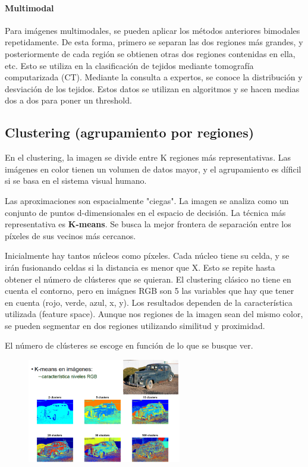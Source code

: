 \paragraph{Multimodal} 
Para imágenes multimodales, se pueden aplicar los métodos anteriores bimodales repetidamente. De esta forma, primero se separan las dos regiones más grandes, y posteriormente de cada región se obtienen otras dos regiones contenidas en ella, etc. Esto se utiliza en la clasificación de tejidos mediante tomografía computarizada (CT). Mediante la consulta a expertos, se conoce la distribución y desviación de los tejidos. Estos datos se utilizan en algoritmos y se hacen medias dos a dos para poner un threshold.

\subsection{Clustering (agrupamiento por regiones)}
En el clustering, la imagen se divide entre K regiones más representativas. Las imágenes en color tienen un volumen de datos mayor, y el agrupamiento es díficil si se basa en el sistema visual humano.

Las aproximaciones son espacialmente "ciegas". La imagen se analiza como un conjunto de puntos d-dimensionales en el espacio de decisión. La técnica más representativa es \textbf{K-means}. Se busca la mejor frontera de separación entre los píxeles de sus vecinos más cercanos. 

Inicialmente hay tantos núcleos como píxeles. Cada núcleo tiene su celda, y se irán fusionando celdas si la distancia es menor que X. Esto se repite hasta obtener el número de clústeres que se quieran. El clustering clásico no tiene en cuenta el contorno, pero en imágnes RGB son 5 las variables que hay que tener en cuenta (rojo, verde, azul, x, y).
Los resultados dependen de la característica utilizada (feature space). Aunque nos regiones de la imagen sean del mismo color, se pueden segmentar en dos regiones utilizando similitud y proximidad.

El número de clústeres se escoge en función de lo que se busque ver.
\begin{figure}[h]
\centering
\includegraphics[width = 0.6\textwidth]{figs/clustering.png}
\end{figure}

